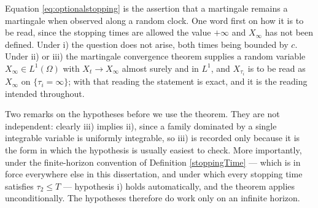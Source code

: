 Equation \eqref{eq:optionalstopping} is the assertion that a martingale remains a martingale when
observed along a random clock. One word first on how it is to be read, since the stopping times are
allowed the value $+\infty$ and $X_\infty$ has not been defined. Under i) the question does not
arise, both times being bounded by $c$. Under ii) or iii) the martingale convergence theorem
supplies a random variable $X_\infty \in L^1(\Omega)$ with $X_t \to X_\infty$ almost surely and in
$L^1$, and $X_{\tau_i}$ is to be read as $X_\infty$ on $\{\tau_i = \infty\}$; with that reading the
statement is exact, and it is the reading intended throughout.

Two remarks on the hypotheses before we use the theorem. They are not
independent: clearly iii) implies ii), since a family dominated by a single integrable variable is uniformly
integrable, so iii) is recorded only because it is the form in which the hypothesis is usually
easiest to check. More importantly, under the finite-horizon convention of Definition
\ref{stoppingTime} --- which is in force everywhere else in this dissertation, and under which every
stopping time satisfies $\tau_2 \leq T$ --- hypothesis i) holds automatically, and the theorem
applies unconditionally. The hypotheses therefore do work only on an infinite horizon. 



